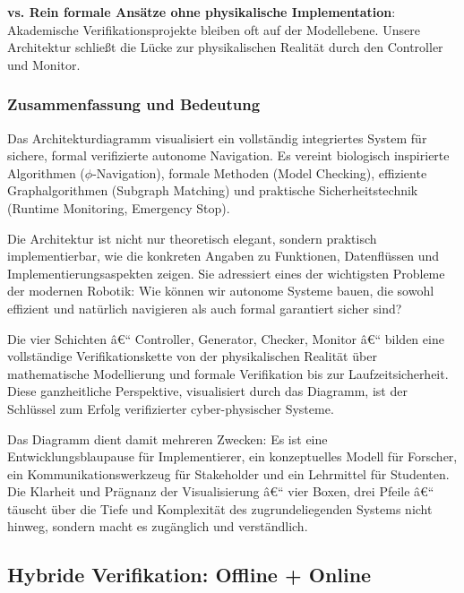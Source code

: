 ﻿\documentclass[a4paper,12pt]{article}
\theoremstyle{definition}
\begin{document}
\textbf{vs. Rein formale Ansätze ohne physikalische Implementation}: Akademische Verifikationsprojekte bleiben oft auf der Modellebene. Unsere Architektur schließt die Lücke zur physikalischen Realität durch den Controller und Monitor.

\subsubsection{Zusammenfassung und Bedeutung}

Das Architekturdiagramm visualisiert ein vollständig integriertes System für sichere, formal verifizierte autonome Navigation. Es vereint biologisch inspirierte Algorithmen ($\phi$-Navigation), formale Methoden (Model Checking), effiziente Graphalgorithmen (Subgraph Matching) und praktische Sicherheitstechnik (Runtime Monitoring, Emergency Stop).

Die Architektur ist nicht nur theoretisch elegant, sondern praktisch implementierbar, wie die konkreten Angaben zu Funktionen, Datenflüssen und Implementierungsaspekten zeigen. Sie adressiert eines der wichtigsten Probleme der modernen Robotik: Wie können wir autonome Systeme bauen, die sowohl effizient und natürlich navigieren als auch formal garantiert sicher sind?

Die vier Schichten â€“ Controller, Generator, Checker, Monitor â€“ bilden eine vollständige Verifikationskette von der physikalischen Realität über mathematische Modellierung und formale Verifikation bis zur Laufzeitsicherheit. Diese ganzheitliche Perspektive, visualisiert durch das Diagramm, ist der Schlüssel zum Erfolg verifizierter cyber-physischer Systeme.

Das Diagramm dient damit mehreren Zwecken: Es ist eine Entwicklungsblaupause für Implementierer, ein konzeptuelles Modell für Forscher, ein Kommunikationswerkzeug für Stakeholder und ein Lehrmittel für Studenten. Die Klarheit und Prägnanz der Visualisierung â€“ vier Boxen, drei Pfeile â€“ täuscht über die Tiefe und Komplexität des zugrundeliegenden Systems nicht hinweg, sondern macht es zugänglich und verständlich.

\subsection{Hybride Verifikation: Offline + Online}
\end{document}
